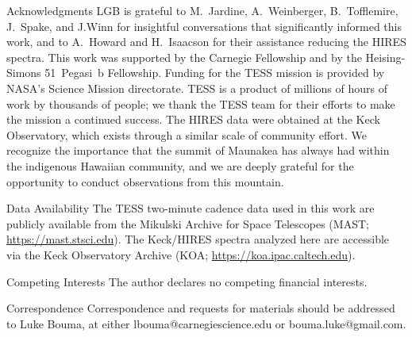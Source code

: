 \documentclass{nature3}
\begin{document}
\begin{methods}
\end{methods}



   


\begin{addendum}

\item[Acknowledgments]
  LGB is grateful to M.~Jardine, A.~Weinberger, B.~Tofflemire, J.~Spake,
  and J.Winn for insightful conversations that significantly informed
  this work, and to A.~Howard and H.~Isaacson for their assistance
  reducing the HIRES spectra.
  This work was supported by the Carnegie Fellowship and by the
  Heising-Simons 51~Pegasi~b Fellowship.
  Funding for the TESS mission is provided by NASA’s Science Mission
  directorate.
  TESS is a product of millions of hours of work by thousands of people;
  we thank the TESS team for their efforts to make the mission a
  continued success.
  The HIRES data were obtained at the Keck Observatory, which exists
  through a similar scale of community effort.
  We recognize the importance that the summit of Maunakea has always had
  within the indigenous Hawaiian community, and we are deeply grateful 
  for the opportunity to conduct observations from this mountain.

%
\item[Data Availability] The TESS two-minute cadence data used in this
  work are publicly available from the Mikulski Archive for Space
  Telescopes (MAST; \url{https://mast.stsci.edu}). The Keck/HIRES
  spectra analyzed here are accessible via the Keck Observatory
  Archive (KOA; \url{https://koa.ipac.caltech.edu}).

\item[Competing Interests] The author declares no competing financial
  interests.
 
\item[Correspondence] Correspondence and requests for materials should
  be addressed to Luke Bouma, at either lbouma@carnegiescience.edu or
  bouma.luke@gmail.com.
\end{addendum}
\end{document}
